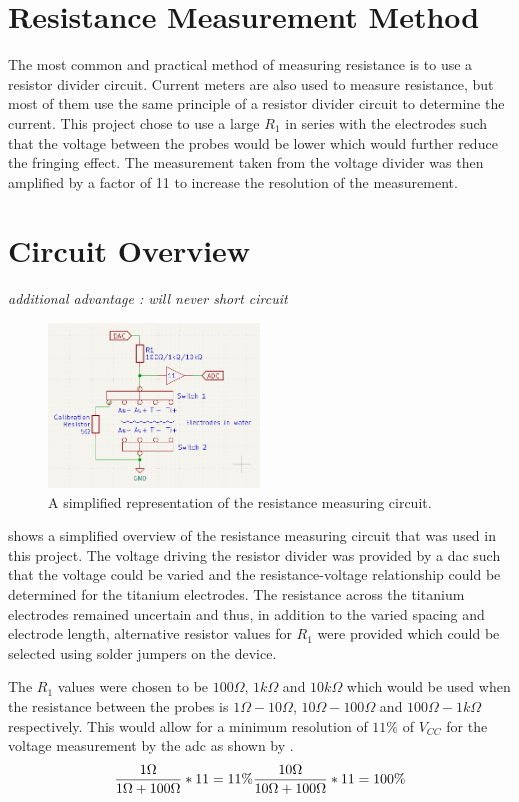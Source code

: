 \section{Resistance Measurement Method}

The most common and practical method of measuring resistance is to use a resistor divider circuit.
Current meters are also used to measure resistance, but most of them use the same principle of a resistor divider circuit to determine the current.
This project chose to use a large $R_1$ in series with the electrodes such that the voltage between the probes would be lower which would further reduce the fringing effect.
The measurement taken from the voltage divider was then amplified by a factor of 11 to increase the resolution of the measurement.

\section{Circuit Overview}
\textit{additional advantage : will never short circuit}
\begin{figure}
    \centering
    \includegraphics[width=0.5\textwidth]{Figures/CircuitOverview}
    \caption{A simplified representation of the resistance measuring circuit.}
    \label{fig:circuit-overview} %
\end{figure}

 shows a simplified overview of the resistance measuring circuit that was used in this project.
The voltage driving the resistor divider was provided by a \gls{dac} such that the voltage could be varied and the resistance-voltage relationship could be determined for the titanium electrodes.
The resistance across the titanium electrodes remained uncertain and thus, in addition to the varied spacing and electrode length, alternative resistor values for $R_1$ were provided which could be selected using solder jumpers on the device.

The $R_1$ values were chosen to be $100\Omega$, $1k\Omega$ and $10k\Omega$ which would be used when the resistance between the probes is $1\Omega - 10\Omega$, $10\Omega - 100\Omega$ and $100\Omega - 1k\Omega$ respectively.
This would allow for a minimum resolution of $11\%$ of $V_{CC}$ for the voltage measurement by the \gls{adc} as shown by .
\begin{equation}\label{eqn:adc-resolution}
    \frac{\displaystyle 1\Omega}{\displaystyle 1\Omega + 100\Omega} * 11 = 11\% \\
    \frac{\displaystyle 10\Omega}{\displaystyle 10\Omega + 100\Omega} * 11 = 100\%
\end{equation} 

